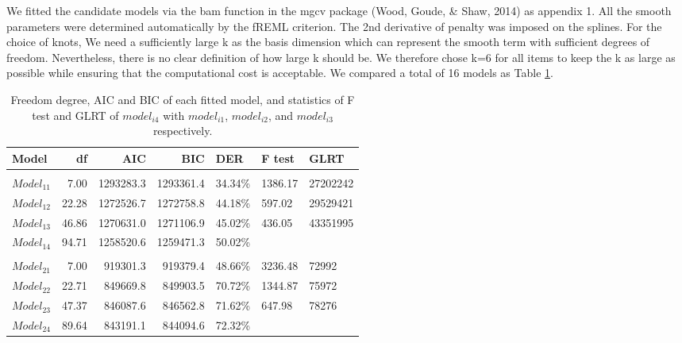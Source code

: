 \documentclass[12pt,oneside]{reedthesis}
\begin{document}
We fitted the candidate models via the bam function in the mgcv package (Wood, Goude, \& Shaw, 2014) as appendix 1. All the smooth parameters were determined automatically by the fREML criterion. The 2nd derivative of penalty was imposed on the splines. For the choice of knots, We need a sufficiently large k as the basis dimension which can represent the smooth term with sufficient degrees of freedom. Nevertheless, there is no clear definition of how large k should be. We therefore chose k=6 for all items to keep the k as large as possible while ensuring that the computational cost is acceptable. We compared a total of 16 models as Table \ref{tab:result}.
\begin{table}[!h]

\caption{\label{tab:unnamed-chunk-9}\label{tab:result} Freedom degree, AIC and BIC of each fitted model, and statistics of F test and GLRT of $model_{i4}$ with $model_{i1}$, $model_{i2}$, and $model_{i3}$ respectively.}
\centering
\fontsize{10}{12}\selectfont
\begin{tabular}[t]{lrrrlll}
\toprule
Model & df & AIC & BIC & DER & F test & GLRT\\
\midrule
\addlinespace[0.3em]
\multicolumn{7}{l}{\textbf{$Model_{1\cdot}$}}\\
\hspace{1em}$Model_{11}$ & 7.00 & 1293283.3 & 1293361.4 & 34.34\% & 1386.17 & 27202242\\
\hspace{1em}$Model_{12}$ & 22.28 & 1272526.7 & 1272758.8 & 44.18\% & 597.02 & 29529421\\
\hspace{1em}$Model_{13}$ & 46.86 & 1270631.0 & 1271106.9 & 45.02\% & 436.05 & 43351995\\
\hspace{1em}$Model_{14}$ & 94.71 & 1258520.6 & 1259471.3 & 50.02\% &  & \\
\addlinespace[0.3em]
\multicolumn{7}{l}{\textbf{$Model_{2\cdot}$}}\\
\hspace{1em}$Model_{21}$ & 7.00 & 919301.3 & 919379.4 & 48.66\% & 3236.48 & 72992\\
\hspace{1em}$Model_{22}$ & 22.71 & 849669.8 & 849903.5 & 70.72\% & 1344.87 & 75972\\
\hspace{1em}$Model_{23}$ & 47.37 & 846087.6 & 846562.8 & 71.62\% & 647.98 & 78276\\
\hspace{1em}$Model_{24}$ & 89.64 & 843191.1 & 844094.6 & 72.32\% &  & \\

\end{tabular}
\end{table}
\end{document}
